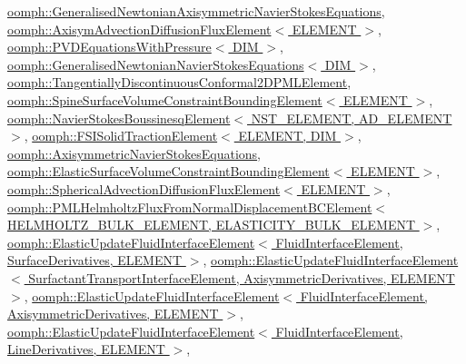 \hyperlink{classoomph_1_1GeneralisedNewtonianAxisymmetricNavierStokesEquations_a95e10086130b3745e915b20c0c3e028a}{oomph\+::\+Generalised\+Newtonian\+Axisymmetric\+Navier\+Stokes\+Equations}, \hyperlink{classoomph_1_1AxisymAdvectionDiffusionFluxElement_a6dc7a3bc74b66449b6588d8ea64e7cd7}{oomph\+::\+Axisym\+Advection\+Diffusion\+Flux\+Element$<$ E\+L\+E\+M\+E\+N\+T $>$}, \hyperlink{classoomph_1_1PVDEquationsWithPressure_ac1d61d6c3be895e5d033cfbcbfc8bd71}{oomph\+::\+P\+V\+D\+Equations\+With\+Pressure$<$ D\+I\+M $>$}, \hyperlink{classoomph_1_1GeneralisedNewtonianNavierStokesEquations_a384bfd4f4b9b88af8f8a2eb100b2f6bb}{oomph\+::\+Generalised\+Newtonian\+Navier\+Stokes\+Equations$<$ D\+I\+M $>$}, \hyperlink{classoomph_1_1TangentiallyDiscontinuousConformal2DPMLElement_a0ed7e453ed779544372498057d197e6a}{oomph\+::\+Tangentially\+Discontinuous\+Conformal2\+D\+P\+M\+L\+Element}, \hyperlink{classoomph_1_1SpineSurfaceVolumeConstraintBoundingElement_a5eec2e025f24120c6f2a959da70bb5b1}{oomph\+::\+Spine\+Surface\+Volume\+Constraint\+Bounding\+Element$<$ E\+L\+E\+M\+E\+N\+T $>$}, \hyperlink{classoomph_1_1NavierStokesBoussinesqElement_a01483469b070309aeb8948273b974feb}{oomph\+::\+Navier\+Stokes\+Boussinesq\+Element$<$ N\+S\+T\+\_\+\+E\+L\+E\+M\+E\+N\+T, A\+D\+\_\+\+E\+L\+E\+M\+E\+N\+T $>$}, \hyperlink{classoomph_1_1FSISolidTractionElement_a789bdb99ca30e3c7b56adab5be79a59d}{oomph\+::\+F\+S\+I\+Solid\+Traction\+Element$<$ E\+L\+E\+M\+E\+N\+T, D\+I\+M $>$}, \hyperlink{classoomph_1_1AxisymmetricNavierStokesEquations_a59e4868055f70d2d230f1642ffa0be11}{oomph\+::\+Axisymmetric\+Navier\+Stokes\+Equations}, \hyperlink{classoomph_1_1ElasticSurfaceVolumeConstraintBoundingElement_a16addc228d9871f22cd9eaf9b581ff5c}{oomph\+::\+Elastic\+Surface\+Volume\+Constraint\+Bounding\+Element$<$ E\+L\+E\+M\+E\+N\+T $>$}, \hyperlink{classoomph_1_1SphericalAdvectionDiffusionFluxElement_a3863a02374ac70bacd47face3285d469}{oomph\+::\+Spherical\+Advection\+Diffusion\+Flux\+Element$<$ E\+L\+E\+M\+E\+N\+T $>$}, \hyperlink{classoomph_1_1PMLHelmholtzFluxFromNormalDisplacementBCElement_a159c7c508fc565f7d70481cd467a5152}{oomph\+::\+P\+M\+L\+Helmholtz\+Flux\+From\+Normal\+Displacement\+B\+C\+Element$<$ H\+E\+L\+M\+H\+O\+L\+T\+Z\+\_\+\+B\+U\+L\+K\+\_\+\+E\+L\+E\+M\+E\+N\+T, E\+L\+A\+S\+T\+I\+C\+I\+T\+Y\+\_\+\+B\+U\+L\+K\+\_\+\+E\+L\+E\+M\+E\+N\+T $>$}, \hyperlink{classoomph_1_1ElasticUpdateFluidInterfaceElement_acc1d5bb57e5664b86a9a76a4cfb8259f}{oomph\+::\+Elastic\+Update\+Fluid\+Interface\+Element$<$ Fluid\+Interface\+Element, Surface\+Derivatives, E\+L\+E\+M\+E\+N\+T $>$}, \hyperlink{classoomph_1_1ElasticUpdateFluidInterfaceElement_acc1d5bb57e5664b86a9a76a4cfb8259f}{oomph\+::\+Elastic\+Update\+Fluid\+Interface\+Element$<$ Surfactant\+Transport\+Interface\+Element, Axisymmetric\+Derivatives, E\+L\+E\+M\+E\+N\+T $>$}, \hyperlink{classoomph_1_1ElasticUpdateFluidInterfaceElement_acc1d5bb57e5664b86a9a76a4cfb8259f}{oomph\+::\+Elastic\+Update\+Fluid\+Interface\+Element$<$ Fluid\+Interface\+Element, Axisymmetric\+Derivatives, E\+L\+E\+M\+E\+N\+T $>$}, \hyperlink{classoomph_1_1ElasticUpdateFluidInterfaceElement_acc1d5bb57e5664b86a9a76a4cfb8259f}{oomph\+::\+Elastic\+Update\+Fluid\+Interface\+Element$<$ Fluid\+Interface\+Element, Line\+Derivatives, E\+L\+E\+M\+E\+N\+T $>$}, 